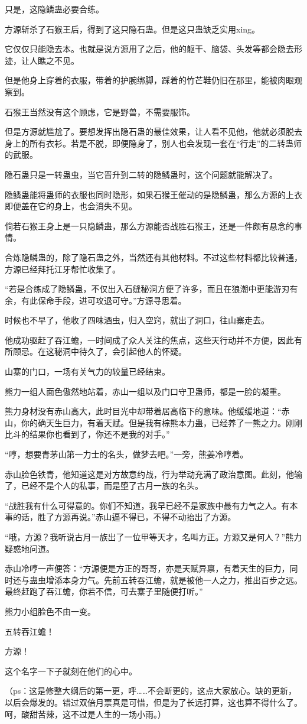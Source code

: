 \begin{this_body}
只是，这隐鳞蛊必要合练。

方源斩杀了石猴王后，得到了这只隐石蛊。但是这只蛊缺乏实用xing。

它仅仅只能隐去本。也就是说方源用了之后，他的躯干、脑袋、头发等都会隐去形迹，让人瞧之不见。

但是他身上穿着的衣服，带着的护腕绑脚，踩着的竹芒鞋仍旧在那里，能被肉眼观察到。

石猴王当然没有这个顾虑，它是野兽，不需要服饰。

但是方源就尴尬了。要想发挥出隐石蛊的最佳效果，让人看不见他，他就必须脱去身上的所有衣衫。若是不脱，即便隐身了，别人也会发现一套在“行走”的二转蛊师的武服。

隐石蛊只是一转蛊虫，当它晋升到二转的隐鳞蛊时，这个问题就能解决了。

隐鳞蛊能将蛊师的衣服也同时隐形，如果石猴王催动的是隐鳞蛊，那么方源的上衣即便盖在它的身上，也会消失不见。

倘若石猴王身上是一只隐鳞蛊，那么方源能否战胜石猴王，还是一件颇有悬念的事情。

合炼隐鳞蛊的，除了隐石蛊之外，当然还有其他材料。不过这些材料都比较普通，方源已经拜托江牙帮忙收集了。

“若是合练成了隐鳞蛊，不仅出入石缝秘洞方便了许多，而且在狼潮中更能游刃有余，有此保命手段，进可攻退可守。”方源寻思着。

时候也不早了，他收了四味酒虫，归入空窍，就出了洞口，往山寨走去。

他成功驱赶了吞江蟾，一时间成了众人关注的焦点，这些天行动并不方便，因此有所顾忌。在这秘洞中待久了，会引起他人的怀疑。

山寨的门口，一场有关气力的较量已经结束。

熊力一组人面色傲然地站着，赤山一组以及门口守卫蛊师，都是一脸的凝重。

熊力身材没有赤山高大，此时目光中却带着居高临下的意味。他缓缓地道：“赤山，你的确天生巨力，有着天赋。但是我有棕熊本力蛊，已经养了一熊之力。刚刚比斗的结果你也看到了，你还不是我的对手。”

“哼，想要青茅山第一力士的名头，做梦去吧。”一旁，熊姜冷哼着。

赤山脸色铁青，他知道这是对方故意约战，行为举动充满了政治意图。此刻，他输了，已经不是个人的私事，而是堕了古月一族的名头。

“战胜我有什么可得意的。你们不知道，我早已经不是家族中最有力气之人。有本事的话，胜了方源再说。”赤山逼不得已，不得不动抬出了方源。

“哦，方源？我听说古月一族出了一位甲等天才，名叫方正。方源又是何人？”熊力疑惑地问道。

赤山冷哼一声便答：“方源便是方正的哥哥，亦是天赋异禀，有着天生的巨力，同时还与蛊虫增添本身力气。先前五转吞江蟾，就是被他一人之力，推出百步之远。最终赶跑了吞江蟾，你若不信，可去寨子里随便打听。”

熊力小组脸色不由一变。

五转吞江蟾！

方源！

这个名字一下子就刻在他们的心中。

（ps：这是修整大纲后的第一更，呼……不会断更的，这点大家放心。缺的更新，以后会爆发的。错过双倍月票真是可惜，但是为了长远打算，这也算不得什么了。呵，酸甜苦辣，这不过是人生的一场小雨。）

\end{this_body}

